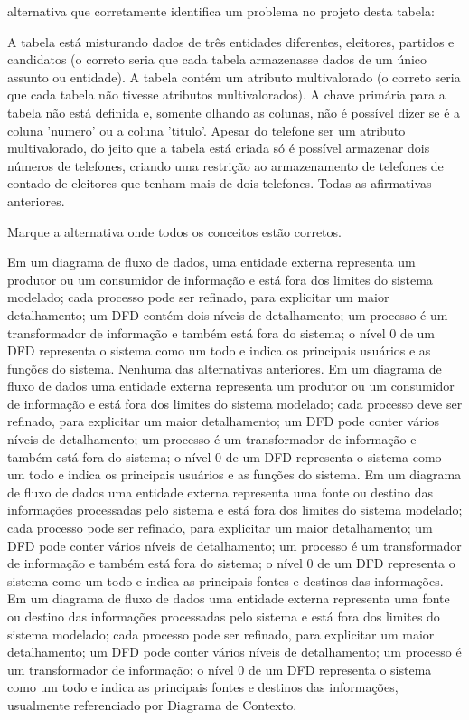 \documentclass[12pt, addpoints]{exam}
\begin{document}
\begin{questions}
alternativa que corretamente identifica um problema no projeto desta tabela:
\begin{choices}
\choice A tabela está misturando dados de três entidades diferentes, eleitores, partidos e candidatos (o correto seria que cada tabela armazenasse dados de um único assunto ou entidade).
\choice A tabela contém um atributo multivalorado (o correto seria que cada tabela não tivesse atributos multivalorados).
\choice A chave primária para a tabela não está definida e, somente olhando as colunas, não é possível dizer se é a coluna 'numero' ou a coluna 'titulo'.
\choice Apesar do telefone ser um atributo multivalorado, do jeito que a tabela está criada só é possível armazenar dois números de telefones, criando uma restrição ao armazenamento de telefones de contado de eleitores que tenham mais de dois telefones.
\choice Todas as afirmativas anteriores.
\end{choices}

\question

Marque a alternativa onde todos os conceitos estão corretos.


\begin{choices}
\choice Em um diagrama de fluxo de dados, uma entidade externa representa um produtor ou um consumidor de informação e está fora dos limites do sistema modelado; cada processo pode ser refinado, para explicitar um maior detalhamento; um DFD contém dois níveis de detalhamento; um processo é um transformador de informação e também está fora do sistema; o nível 0 de um DFD representa o sistema como um todo e indica os principais usuários e as funções do sistema.
\choice Nenhuma das alternativas anteriores.
\choice Em um diagrama de fluxo de dados uma entidade externa representa um produtor ou um consumidor de informação e está fora dos limites do sistema modelado; cada processo deve ser refinado, para explicitar um maior detalhamento; um DFD pode conter vários níveis de detalhamento; um processo é um transformador de informação e também está fora do sistema; o nível 0 de um DFD representa o sistema como um todo e indica os principais usuários e as funções do sistema.
\choice Em um diagrama de fluxo de dados uma entidade externa representa uma fonte ou destino das informações processadas pelo sistema e está fora dos limites do sistema modelado; cada processo pode ser refinado, para explicitar um maior detalhamento; um DFD pode conter vários níveis de detalhamento; um processo é um transformador de informação e também está fora do sistema; o nível 0 de um DFD representa o sistema como um todo e indica as principais fontes e destinos das informações.
\choice Em um diagrama de fluxo de dados uma entidade externa representa uma fonte ou destino das informações processadas pelo sistema e está fora dos limites do sistema modelado; cada processo pode ser refinado, para explicitar um maior detalhamento; um DFD pode conter vários níveis de detalhamento; um processo é um transformador de informação; o nível 0 de um DFD representa o sistema como um todo e indica as principais fontes e destinos das informações, usualmente referenciado por Diagrama de Contexto.
\end{choices}


\end{questions}
\end{document}

